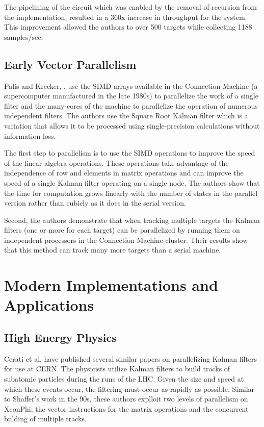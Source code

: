 \documentclass[11pt]{article}
\begin{document}
The pipelining of the circuit which was enabled by the removal of recursion from the implementation, resulted in a 360x increase in throughput for the system. This improvement allowed the authors to over 500 targets while collecting 1188 samples/sec.

\subsection{Early Vector Parallelism}
Palis and Krecker, \cite{palis1990parallel}, use the SIMD arrays available in the Connection Machine (a supercomputer manufactured in the late 1980s) to parallelize the work of a single filter and the many-cores of the machine to parallelize the operation of numerous independent filters. The authors use the Square Root Kalman filter which is a variation that allows it to be processed using single-precision calculations without information loss.

The first step to parallelism is to use the SIMD operations to improve the speed of the linear algebra operations. These operations take advantage of the independence of row and elements in matrix operations and can improve the speed of a single Kalman filter operating on a single node. The authors show that the time for computation grows linearly with the number of states in the parallel version rather than cubicly as it does in the serial version. 

Second, the authors demonstrate that when tracking multiple targets the Kalman filters (one or more for each target) can be parallelized by running them on independent processors in the Connection Machine cluster. Their results show that this method can track many more targets than a serial machine.

\section{Modern Implementations and Applications}

\subsection{High Energy Physics}
Cerati et al. have published several similar papers \cite{cerati2015kalman,cerati2016kalman,cerati2015traditional} on parallelizing Kalman filters for use at CERN. The physicists utilize Kalman filters to build tracks of subatomic particles during the runs of the LHC. Given the size and speed at which these events occur, the filtering must occur as rapidly as possible. Similar to Shaffer's work in the 90s, these authors explloit two levels of parallelism on XeonPhi; the vector instructions for the matrix operations and the concurrent bulding of multiple tracks.
\end{document}
